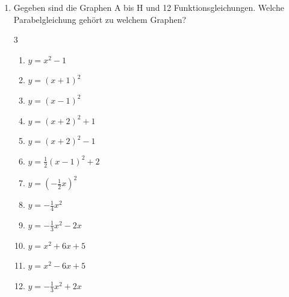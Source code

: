 \begin{enumerate}
          \begin{enumerate}
              \item $y=(x+2)^2$
              \item $y=-\left(x-\dfrac{11}{4}\right)^2-2$
              \item $y=2x^2-4x$
              \item $y=-\dfrac{1}{2}x^2+6x-7$
          \end{enumerate}
    \item Gegeben sind die Graphen A bis H und 12 Funktionsgleichungen. Welche Parabelgleichung gehört zu welchem Graphen?
          \begin{multicols}{3}
              \begin{enumerate}[label=(\arabic*)]
                  \item \(y=x^2-1\)
                  \item \(y=(x+1)^2\)
                  \item \(y=(x-1)^2\)
                  \item \(y=(x+2)^2+1\)
                  \item \(y=(x+2)^2-1\)
                  \item \(y=\frac12(x-1)^2+2\)
                  \item \(y=\left(-\frac12x\right)^2\)
                  \item \(y=-\frac14x^2\)
                  \item \(y=-\frac13x^2-2x\)
                  \item \(y=x^2+6x+5\)
                  \item \(y=x^2-6x+5\)
                  \item \(y=-\frac13x^2+2x\)
              \end{enumerate}
          \end{multicols}
          \begin{center}
\end{center}
\end{enumerate}

